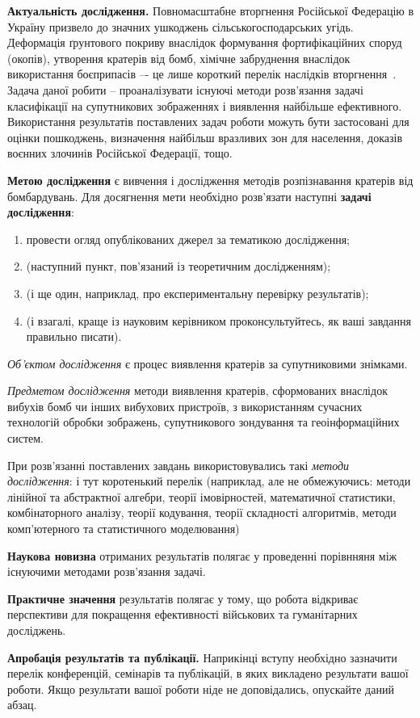\textbf{Актуальність дослідження.} Повномасштабне вторгнення Російської Федерацію
в Україну призвело до значних ушкоджень сільськогосподарських угідь.
Деформація ґрунтового покриву внаслідок формування фортифікаційних
споруд (окопів), утворення кратерів від бомб, хімічне забруднення внаслідок
використання боєприпасів –- це лише короткий перелік наслідків вторгнення~\cite{golubtsov2023}.
Задача даної робити -- проаналізувати існуючі методи розв'язання задачі класифікації
на супутникових зображеннях і виявлення найбільше ефективного.
Використання результатів поставлених задач роботи можуть бути застосовані для оцінки пошкоджень,
визначення найбільш вразливих зон для населення, доказів воєнних злочинів Російської Федерації, тощо.

\textbf{Метою дослідження} є вивчення і дослідження методів розпізнавання кратерів від бомбардувань.
Для досягнення мети необхідно розв'язати наступні \textbf{задачі дослідження}:

\begin{enumerate}
    \item провести огляд опублікованих джерел за тематикою дослідження;
    \item (наступний пункт, пов'язаний із теоретичним дослідженням);
    \item (і ще один, наприклад, про експериментальну перевірку результатів);
    \item (і взагалі, краще із науковим керівником проконсультуйтесь, як ваші
          завдання правильно писати).
\end{enumerate}

\emph{Об'єктом дослідження} є процес виявлення кратерів за супутниковими знімками.

\emph{Предметом дослідження} методи виявлення кратерів, сформованих внаслідок вибухів
бомб чи інших вибухових пристроїв, з використанням сучасних технологій обробки зображень,
супутникового зондування та геоінформаційних систем.

При розв’язанні поставлених завдань використовувались такі \emph{методи дослідження}: і
тут коротенький перелік (наприклад, але не обмежуючись: методи лінійної та абстрактної
алгебри, теорії імовірностей, математичної статистики, комбінаторного
аналізу, теорії кодування, теорії складності алгоритмів, методи
комп’ютерного та статистичного моделювання)

\textbf{Наукова новизна} отриманих результатів полягає у проведенні порівнняня між існуючими
методами розв'язання задачі.

\textbf{Практичне значення} результатів полягає у тому,
що робота відкриває перспективи для покращення ефективності військових
та гуманітарних досліджень.

\textbf{Апробація результатів та публікації.} Наприкінці вступу необхідно
зазначити перелік конференцій, семінарів та публікацій, в яких викладено
результати вашої роботи. Якщо результати вашої роботи ніде не
доповідались, опускайте даний абзац.
